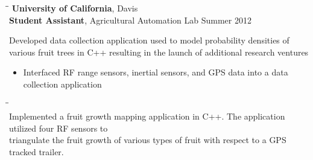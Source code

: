\documentclass{res}
\begin{document}
\begin{resume}
   \begin{tabbing}
   \hspace{2.3in}\= \hspace{2.6in}\= \kill %
		{\bf University of California}, Davis \\
    {\bf Student Assistant}, Agricultural Automation Lab \>
		\> Summer 2012\\
   \end{tabbing}\vspace{-32pt}      %
	 Developed data collection application used to model
					 probability densities of various fruit trees
					 in C++ resulting in the launch of additional
					 research ventures
					 \vspace{2pt}
	 \begin{itemize}\addtolength{\itemsep}{-0.5\baselineskip}
	 \item Interfaced RF range sensors, inertial sensors, and GPS data into a data collection application
	 \end{itemize}
	 \vspace{-15pt}
	 \hspace{3pt}{\bf Projects}
	 \vspace{-20pt}
	\begin{tabbing}
	 \hspace{0.25in}\= \hspace{0.25in}\= \kill %
	 \\
	 \vspace{-30pt}
 \>\> Implemented a fruit growth mapping application in C++.  The application utilized four RF sensors 
  to \\ \>\> triangulate the fruit growth of various types of fruit with respect to a GPS tracked trailer.
\end{tabbing}\vspace{-10pt}


\end{resume}
\end{document}
